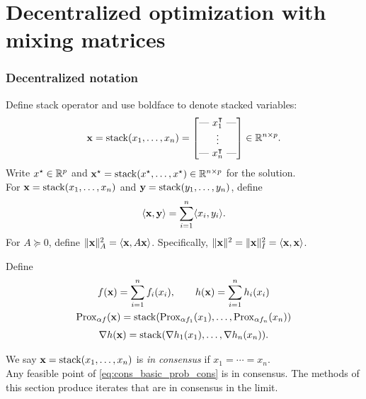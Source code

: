 \documentclass[10pt,mathserif]{beamer}
\begin{document}
\section{Decentralized optimization with mixing matrices}
\begin{frame}
\frametitle{Decentralized notation}
Define stack operator and use boldface to denote stacked variables:
\begin{align*}
  {\mathbf{x}} = \mathrm{stack}(x_1,\dots,x_n) = \begin{bmatrix}
         \text{---}~x_{1}^\intercal~\text{---} \\
         \vdots \\
         \text{---}~x_{n}^\intercal~\text{---}
       \end{bmatrix}\in \mathbb{R}^{n\times p}.
\end{align*}
Write $x^\star\in\mathbb{R}^p$ and ${\mathbf{x}}^\star=\mathrm{stack}(x^\star,\dots,x^\star)\in\mathbb{R}^{n\times p}$ for the solution.\\
For ${\mathbf{x}} = \mathrm{stack}(x_1,\dots,x_n)$ and ${\mathbf{y}} = \mathrm{stack}(y_1,\dots,y_n)$, define
\[
\langle {\mathbf{x}},{\mathbf{y}}\rangle=\sum^n_{i=1}\langle x_i,y_i\rangle.
\]
For $A\succeq 0$, define $\|{\mathbf{x}}\|_A^2=\langle {\mathbf{x}},A{\mathbf{x}}\rangle$. Specifically, $\|{\mathbf{x}}\|^2=\|{\mathbf{x}}\|_I^2=\langle {\mathbf{x}},{\mathbf{x}}\rangle$.
\end{frame}

\begin{frame}
Define
\begin{gather*}
f({\mathbf{x}})=\sum_{i=1}^n  f_i(x_i),\qquad
h({\mathbf{x}})=\sum_{i=1}^n  h_i(x_i)\\
\mathrm{Prox}_{\alpha f}({\mathbf{x}})=\mathrm{stack}(\mathrm{Prox}_{\alpha f_1}(x_1),\dots,\mathrm{Prox}_{\alpha f_n}(x_n))\\[3pt]
\nabla h({\mathbf{x}})=\mathrm{stack}(\nabla h_1(x_1),\dots,\nabla h_n(x_n)).
\end{gather*}

\vspace{0.2in}

We say ${\mathbf{x}} = \mathrm{stack}(x_1,\dots,x_n)$ is \emph{in consensus} if $x_1=\cdots=x_n$.\\
Any feasible point of \eqref{eq:cons_basic_prob_cons} is in consensus.
The methods of this section produce iterates that are in consensus in the limit.
\end{frame}
\end{document}
